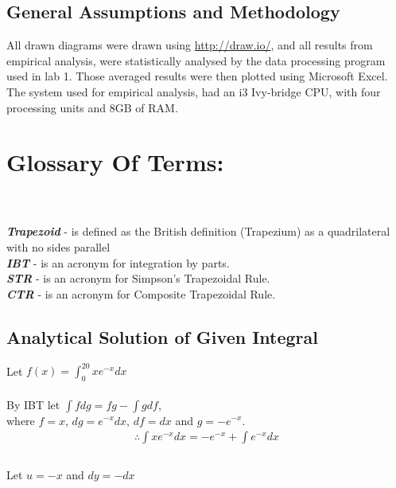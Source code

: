 \documentclass[11pt]{article}
\begin{document}
\begin{page}

\clearpage
\setcounter{page}{1}

\section{General Assumptions and Methodology}
All drawn diagrams were drawn using \url{http://draw.io/}, and all results from empirical analysis, were statistically analysed by the data processing program used in lab 1. Those averaged results were then plotted using Microsoft Excel.\\

\noindent The system used for empirical analysis, had an i3 Ivy-bridge CPU, with four processing units and 8GB of RAM.\\

\noindent \large \chapter{\textbf{Glossary Of Terms:}}\\\\
\noindent \textbf{\textit{Trapezoid}} - is defined as the British definition (Trapezium) as a quadrilateral with no sides parallel \\
\noindent \textbf{\textit{IBT}} - is an acronym for integration by parts.\\
\noindent \textbf{\textit{STR}} - is an acronym for Simpson's Trapezoidal Rule.\\
\noindent \textbf{\textit{CTR}} - is an acronym for Composite Trapezoidal Rule.\\

\section{Analytical Solution of Given Integral}
\noindent Let $f(x) = \int_{0}^{20} xe^{-x} dx$\\
\\
\noindent By IBT let $\int fdg = fg - \int gdf$, \\
where $f = x$, $dg = e^{-x} dx$, $df = dx$ and $g = -e^{-x}$.\\

\begin{equation} 
\begin{aligned}
    \therefore{} \int xe^{-x} dx = -e^{-x} + \int e^{-x} dx\\ 
\end{aligned}
\end{equation}
\\
\noindent Let $u = -x$ and $dy = -dx$


\end{page}
\end{document}
